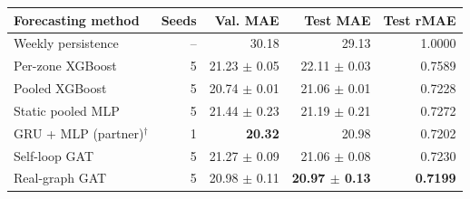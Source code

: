 \begin{tabular}{lrrrr}
\toprule
Forecasting method & Seeds & Val. MAE & Test MAE & Test rMAE \\
\midrule
Weekly persistence & -- & 30.18 & 29.13 & 1.0000 \\
\midrule
Per-zone XGBoost & 5 & 21.23 $\pm$ 0.05 & 22.11 $\pm$ 0.03 & 0.7589 \\
Pooled XGBoost & 5 & 20.74 $\pm$ 0.01 & 21.06 $\pm$ 0.01 & 0.7228 \\
\midrule
Static pooled MLP & 5 & 21.44 $\pm$ 0.23 & 21.19 $\pm$ 0.21 & 0.7272 \\
GRU + MLP (partner)$^\dagger$ & 1 & \textbf{20.32} & 20.98 & 0.7202 \\
\midrule
Self-loop GAT & 5 & 21.27 $\pm$ 0.09 & 21.06 $\pm$ 0.08 & 0.7230 \\
Real-graph GAT & 5 & 20.98 $\pm$ 0.11 & \textbf{20.97 $\pm$ 0.13} & \textbf{0.7199} \\
\bottomrule
\end{tabular}
